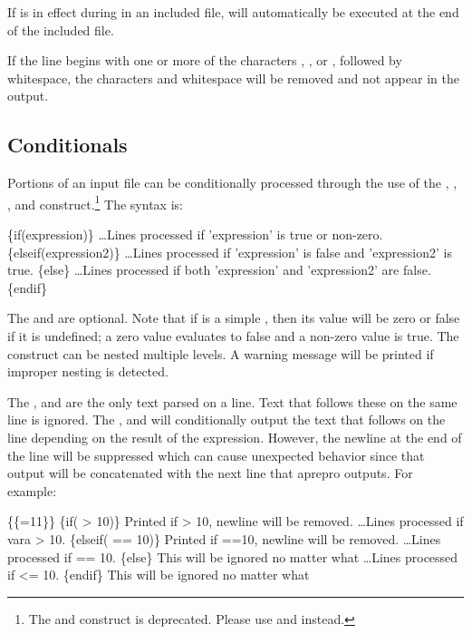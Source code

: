If  is in effect during in an included file, 
will automatically be executed at the end of the included file.

If the line begins with one or more of the characters \cmd{\#}, \cmd{\$}, or \cmd{//}, followed by whitespace, the characters and whitespace will be removed and not appear in the output.

\subsection{Conditionals} Portions of an input file can be conditionally processed
through the use of the , , , and 
construct.\footnote{The  and  construct is deprecated. Please use  and  instead.}
The syntax is:

\begin{apinp}
\{if(expression)\}
\ldots Lines processed if 'expression' is true or non-zero.
\{elseif(expression2)\}
\ldots Lines processed if 'expression' is false and 'expression2' is true.
\{else\}
\ldots Lines processed if both 'expression' and 'expression2' are false.
\{endif\}
\end{apinp}

The  and  are optional.  Note that if  is a simple , then its value will be zero or false if it is undefined; a zero value evaluates to false and a non-zero value is true. The  construct can be nested multiple levels.
A warning message will be printed if improper nesting is detected. 

The , and  are the only text parsed on a
line. Text that follows these on the same line is ignored.  The
, and  will conditionally output the text that
follows on the line depending on the result of the expression.
However, the newline at the end of the line will be suppressed which
can cause unexpected behavior since that output will be concatenated
with the next line that aprepro outputs.  For example:

\begin{apinp}
\{\{=11\}\}
\{if( > 10)\}  Printed if  > 10, newline will be removed.
\ldots Lines processed if var{a} > 10.
\{elseif( == 10)\}  Printed if ==10, newline will be removed.
\ldots Lines processed if  == 10.
\{else\} This will be ignored no matter what
\ldots Lines processed if  <= 10.
\{endif\} This will be ignored no matter what
\end{apinp}

